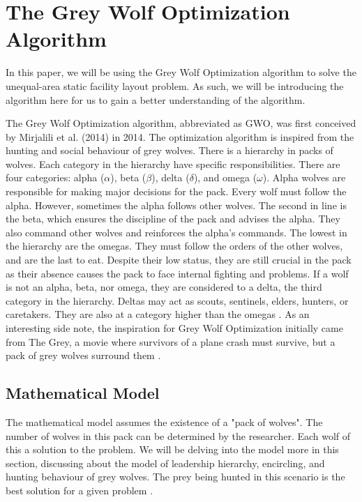\section{The Grey Wolf Optimization Algorithm}
In this paper, we will be using the Grey Wolf Optimization algorithm to solve the unequal-area static facility layout problem. As such, we will be introducing the algorithm here for us to gain a better understanding of the algorithm.

The Grey Wolf Optimization algorithm, abbreviated as GWO, was first conceived by Mirjalili  et al. (2014) in 2014. The optimization algorithm is inspired from the hunting and social behaviour of grey wolves. There is a hierarchy in packs of wolves. Each category in the hierarchy have specific responsibilities. There are four categories: alpha ($\alpha$), beta ($\beta$), delta ($\delta$), and omega ($\omega$). Alpha wolves are responsible for making major decisions for the pack. Every wolf must follow the alpha. However, sometimes the alpha follows other wolves. The second in line is the beta, which ensures the discipline of the pack and advises the alpha. They also command other wolves and reinforces the alpha's commands. The lowest in the hierarchy are the omegas. They must follow the orders of the other wolves, and are the last to eat. Despite their low status, they are still crucial in the pack as their absence causes the pack to face internal fighting and problems. If a wolf is not an alpha, beta, nor omega, they are considered to a delta, the third category in the hierarchy. Deltas may act as scouts, sentinels, elders, hunters, or caretakers. They are also at a category higher than the omegas \cite{Mirjalili2014} \cite{Gupta2018}. As an interesting side note, the inspiration for Grey Wolf Optimization initially came from The Grey, a movie where survivors of a plane crash must survive, but a pack of grey wolves surround them \cite{TheGreyPlotSummary2011}.

\subsection{Mathematical Model}
The mathematical model assumes the existence of a "pack of wolves". The number of wolves in this pack can be determined by the researcher. Each wolf of this a solution to the problem. We will be delving into the model more in this section, discussing about the model of leadership hierarchy, encircling, and hunting behaviour of grey wolves. The prey being hunted in this scenario is the best solution for a given problem \cite{Mirjalili2014}.

